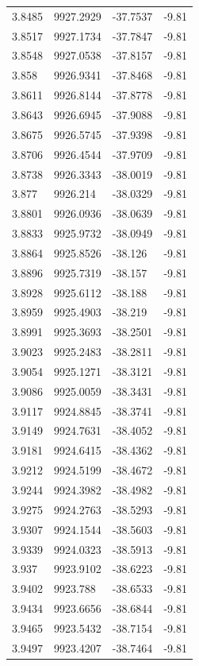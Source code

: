 \begin{table}[H]
\begin{tabular}{llll}
3.8485 & 9927.2929 & -37.7537 & -9.81 \\
3.8517 & 9927.1734 & -37.7847 & -9.81 \\
3.8548 & 9927.0538 & -37.8157 & -9.81 \\
3.858 & 9926.9341 & -37.8468 & -9.81 \\
3.8611 & 9926.8144 & -37.8778 & -9.81 \\
3.8643 & 9926.6945 & -37.9088 & -9.81 \\
3.8675 & 9926.5745 & -37.9398 & -9.81 \\
3.8706 & 9926.4544 & -37.9709 & -9.81 \\
3.8738 & 9926.3343 & -38.0019 & -9.81 \\
3.877 & 9926.214 & -38.0329 & -9.81 \\
3.8801 & 9926.0936 & -38.0639 & -9.81 \\
3.8833 & 9925.9732 & -38.0949 & -9.81 \\
3.8864 & 9925.8526 & -38.126 & -9.81 \\
3.8896 & 9925.7319 & -38.157 & -9.81 \\
3.8928 & 9925.6112 & -38.188 & -9.81 \\
3.8959 & 9925.4903 & -38.219 & -9.81 \\
3.8991 & 9925.3693 & -38.2501 & -9.81 \\
3.9023 & 9925.2483 & -38.2811 & -9.81 \\
3.9054 & 9925.1271 & -38.3121 & -9.81 \\
3.9086 & 9925.0059 & -38.3431 & -9.81 \\
3.9117 & 9924.8845 & -38.3741 & -9.81 \\
3.9149 & 9924.7631 & -38.4052 & -9.81 \\
3.9181 & 9924.6415 & -38.4362 & -9.81 \\
3.9212 & 9924.5199 & -38.4672 & -9.81 \\
3.9244 & 9924.3982 & -38.4982 & -9.81 \\
3.9275 & 9924.2763 & -38.5293 & -9.81 \\
3.9307 & 9924.1544 & -38.5603 & -9.81 \\
3.9339 & 9924.0323 & -38.5913 & -9.81 \\
3.937 & 9923.9102 & -38.6223 & -9.81 \\
3.9402 & 9923.788 & -38.6533 & -9.81 \\
3.9434 & 9923.6656 & -38.6844 & -9.81 \\
3.9465 & 9923.5432 & -38.7154 & -9.81 \\
3.9497 & 9923.4207 & -38.7464 & -9.81 \\

\end{tabular}
\end{table}
